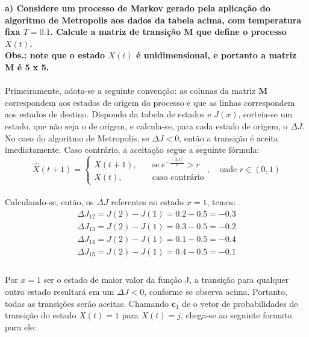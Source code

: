 \documentclass{report}
\begin{document}
\textbf{a) Considere um processo de Markov gerado pela aplicação do algoritmo de Metropolis aos dados da tabela acima, com temperatura fixa $T = 0.1$. Calcule a matriz de transição $\mathbf{M}$ que define o processo $X(t)$.}\\

\textbf{Obs.: note que o estado $X(t)$ é unidimensional, e portanto a matriz $\mathbf{M}$ é 5 x 5.}\\

\paragraph{} Primeiramente, adota-se a seguinte convenção: as colunas da matriz $\mathbf{M}$ correspondem aos estados de origem do processo e que as linhas correspondem aos estados de destino. Dispondo da tabela de estados e $J(x)$, sorteia-se um estado, que não seja o de origem, e calcula-se, para cada estado de origem, o $\Delta J$. No caso do algoritmo de Metropolis, se $\Delta J < 0$, então a transição é aceita imediatamente. Caso contrário, a aceitação segue a seguinte fórmula:\\

\begin{equation*}
\hat{X}(t+1) = \begin{cases}
		  	X(t+1), \quad &\text{se} \  e^{- \frac{(\Delta J)}{T}} > r \\
   		 	X(t), \quad &\text{caso contrário}
		  \end{cases}, \quad \text{onde } r \in (0,1)
\end{equation*}

\paragraph{} Calculando-se, então, os $\Delta J$ referentes ao estado $x = 1$, temos:\\

\begin{align*}
\Delta J_{12} = J(2) - J(1) = 0.2 - 0.5 = - 0.3\\
\Delta J_{13} = J(2) - J(1) = 0.3 - 0.5 = - 0.2\\
\Delta J_{14} = J(2) - J(1) = 0.1 - 0.5 = - 0.4\\
\Delta J_{15} = J(2) - J(1) = 0.4 - 0.5 = - 0.1\\
\end{align*}

\paragraph{} Por $x = 1$ ser o estado de maior valor da função J, a transição para qualquer outro estado resultará em um $\Delta J < 0$, conforme se observa acima. Portanto, todas as transições serão aceitas. Chamando $\mathbf{c}_1$ de o vetor de probabilidades de transição do estado $X(t) = 1$ para $X(t) = j$, chega-se ao seguinte formato para ele:\\
\end{document}
